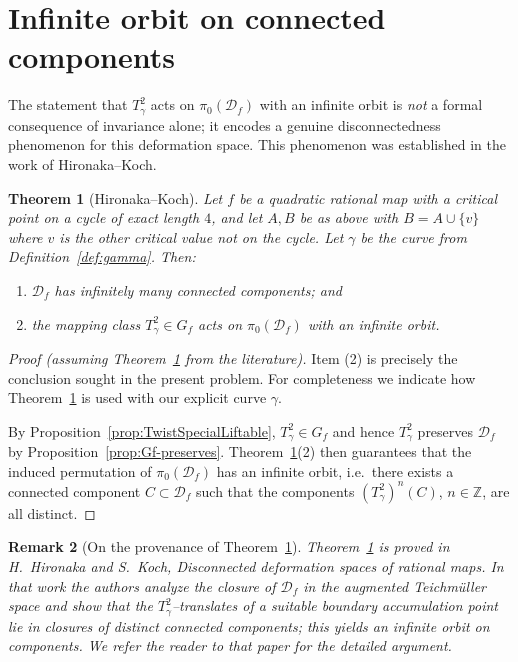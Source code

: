 \documentclass[11pt]{article}
\newtheorem{theorem}{Theorem}[section]
\newtheorem{remark}[theorem]{Remark}
\begin{document}
\section{Infinite orbit on connected components}

The statement that $T_\gamma^2$ acts on $\pi_0(\mathcal D_f)$ with an infinite orbit is \emph{not} a formal consequence of invariance alone; it encodes a genuine disconnectedness phenomenon for this deformation space. This phenomenon was established in the work of Hironaka--Koch.

\begin{theorem}[Hironaka--Koch]\label{thm:HK}
Let $f$ be a quadratic rational map with a critical point on a cycle of exact length $4$, and let $A,B$ be as above with $B=A\cup\{v\}$ where $v$ is the other critical value not on the cycle. Let $\gamma$ be the curve from Definition~\ref{def:gamma}. Then:
\begin{enumerate}
\item $\mathcal D_f$ has infinitely many connected components; and
\item the mapping class $T_\gamma^2\in G_f$ acts on $\pi_0(\mathcal D_f)$ with an infinite orbit.
\end{enumerate}
\end{theorem}

\begin{proof}[Proof (assuming Theorem~\ref{thm:HK} from the literature)]
Item (2) is precisely the conclusion sought in the present problem. For completeness we indicate how Theorem~\ref{thm:HK} is used with our explicit curve $\gamma$.

By Proposition~\ref{prop:TwistSpecialLiftable}, $T_\gamma^2\in G_f$ and hence $T_\gamma^2$ preserves $\mathcal D_f$ by Proposition~\ref{prop:Gf-preserves}. Theorem~\ref{thm:HK}(2) then guarantees that the induced permutation of $\pi_0(\mathcal D_f)$ has an infinite orbit, i.e.\ there exists a connected component $C\subset \mathcal D_f$ such that the components $(T_\gamma^2)^n(C)$, $n\in\mathbb Z$, are all distinct.
\end{proof}

\begin{remark}[On the provenance of Theorem~\ref{thm:HK}]
Theorem~\ref{thm:HK} is proved in H.~Hironaka and S.~Koch, \emph{Disconnected deformation spaces of rational maps}. In that work the authors analyze the closure of $\mathcal D_f$ in the augmented Teichm\"uller space and show that the $T_\gamma^2$--translates of a suitable boundary accumulation point lie in closures of distinct connected components; this yields an infinite orbit on components. We refer the reader to that paper for the detailed argument.
\end{remark}
\end{document}
